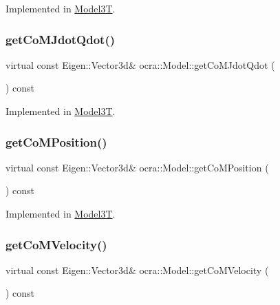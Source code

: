 Implemented in \hyperlink{classModel3T_a6b63e04105ce4fa8026681ea1109702e}{Model3T}.

\hypertarget{classocra_1_1Model_a2be9c0fdd8dbe4ecbb99eef5f4ea45d1}{}\label{classocra_1_1Model_a2be9c0fdd8dbe4ecbb99eef5f4ea45d1} 
\subsubsection{\texorpdfstring{get\+Co\+M\+Jdot\+Qdot()}{getCoMJdotQdot()}}
{\footnotesize\ttfamily virtual const Eigen\+::\+Vector3d\& ocra\+::\+Model\+::get\+Co\+M\+Jdot\+Qdot (\begin{DoxyParamCaption}{ }\end{DoxyParamCaption}) const\hspace{0.3cm}{\ttfamily [pure virtual]}}



Implemented in \hyperlink{classModel3T_a408213f442ab7287c44e86e6d72f825c}{Model3T}.

\hypertarget{classocra_1_1Model_a9c3b077772e4886299f613a71f8981e2}{}\label{classocra_1_1Model_a9c3b077772e4886299f613a71f8981e2} 
\subsubsection{\texorpdfstring{get\+Co\+M\+Position()}{getCoMPosition()}}
{\footnotesize\ttfamily virtual const Eigen\+::\+Vector3d\& ocra\+::\+Model\+::get\+Co\+M\+Position (\begin{DoxyParamCaption}{ }\end{DoxyParamCaption}) const\hspace{0.3cm}{\ttfamily [pure virtual]}}



Implemented in \hyperlink{classModel3T_ad81ca6213b967fb62d8c1682c3389736}{Model3T}.

\hypertarget{classocra_1_1Model_a567e950be5868080c250c40d8fc0c0ce}{}\label{classocra_1_1Model_a567e950be5868080c250c40d8fc0c0ce} 
\subsubsection{\texorpdfstring{get\+Co\+M\+Velocity()}{getCoMVelocity()}}
{\footnotesize\ttfamily virtual const Eigen\+::\+Vector3d\& ocra\+::\+Model\+::get\+Co\+M\+Velocity (\begin{DoxyParamCaption}{ }\end{DoxyParamCaption}) const\hspace{0.3cm}{\ttfamily [pure virtual]}}



